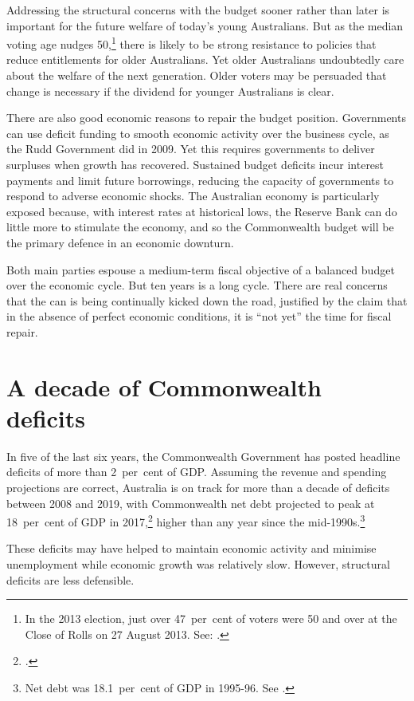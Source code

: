 \documentclass[twoside,english]{Dianab5ona4portrait}
\begin{document}
Addressing the structural concerns with the budget sooner rather than later is important for the future welfare of today’s young Australians. But as the median voting age nudges 50,\footnote{In the 2013 election, just over 47~per~cent of voters were 50 and over at the Close of Rolls on 27 August 2013. See: \textcite{AEC2013}.}  there is likely to be strong resistance to policies that reduce entitlements for older Australians. Yet older Australians undoubtedly care about the welfare of the next generation. Older voters may be persuaded that change is necessary if the dividend for younger Australians is clear. 

There are also good economic reasons to repair the budget position. Governments can use deficit funding to smooth economic activity over the business cycle, as the Rudd Government did in 2009. Yet this requires governments to deliver surpluses when growth has recovered. Sustained budget deficits incur interest payments and limit future borrowings, reducing the capacity of governments to respond to adverse economic shocks. The Australian economy is particularly exposed because, with interest rates at historical lows, the Reserve Bank can do little more to stimulate the economy, and so the Commonwealth budget will be the primary defence in an economic downturn. 

Both main parties espouse a medium-term fiscal objective of a balanced budget over the economic cycle. But ten years is a long cycle. There are real concerns that the can is being continually kicked down the road, justified by the claim that in the absence of perfect economic conditions, it is “not yet” the time for fiscal repair.
\cleardoubleevenstandardpage
\@openrighttrue\makeatother
\chapter{A decade of Commonwealth deficits}\label{chapter:FISCAL-2}
In five of the last six years, the Commonwealth Government has posted headline deficits of more than 2~per~cent of GDP\@. Assuming the revenue and spending projections are correct, Australia is on track for more than a decade of deficits between 2008 and 2019, with Commonwealth net debt projected to peak at 18~per~cent of GDP in 2017,\footcite[][3--9]{Treasury2015BudgetPapers201516}  higher than any year since the mid-1990s.\footnote{Net debt was 18.1~per~cent of GDP in 1995-96. See \textcite[][273]{Treasury2014-MYEFO-2014-15}.}

These deficits may have helped to maintain economic activity and minimise unemployment while economic growth was relatively slow. However, structural deficits are less defensible. 
\end{document}
